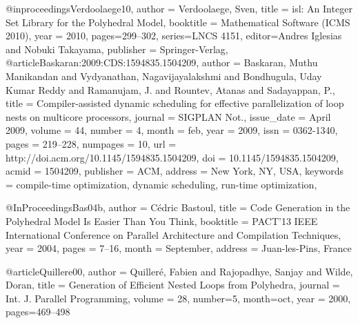 @inproceedings{Verdoolaege10,
   author = {Verdoolaege, Sven},
   title = {isl: {A}n Integer Set Library for the Polyhedral Model},
   booktitle = {Mathematical Software (ICMS 2010)},
   year = {2010},
   pages={299--302},
   series={LNCS 4151},
   editor={Andres Iglesias and Nobuki Takayama},
   publisher = {Springer-Verlag},
}
@article{Baskaran:2009:CDS:1594835.1504209,
 author = {Baskaran, Muthu Manikandan and Vydyanathan, Nagavijayalakshmi and Bondhugula, Uday Kumar Reddy and Ramanujam, J. and Rountev, Atanas and Sadayappan, P.},
 title = {Compiler-assisted dynamic scheduling for effective parallelization of loop nests on multicore processors},
 journal = {SIGPLAN Not.},
 issue_date = {April 2009},
 volume = {44},
 number = {4},
 month = feb,
 year = {2009},
 issn = {0362-1340},
 pages = {219--228},
 numpages = {10},
 url = {http://doi.acm.org/10.1145/1594835.1504209},
 doi = {10.1145/1594835.1504209},
 acmid = {1504209},
 publisher = {ACM},
 address = {New York, NY, USA},
 keywords = {compile-time optimization, dynamic scheduling, run-time optimization},
}

@InProceedings{Bas04b,
 author = {C\'{e}dric Bastoul},
 title = {Code Generation in the Polyhedral Model Is Easier Than You Think},
 booktitle = {PACT'13 IEEE International Conference on Parallel Architecture
              and Compilation Techniques},
 year =	2004,
 pages = {7--16},
 month = {September},
 address = {Juan-les-Pins, France}
}

@article{Quillere00,
 author = {Quiller\'{e}, Fabien and Rajopadhye, Sanjay and Wilde, Doran},
 title = {Generation of Efficient Nested Loops from Polyhedra},
 journal = {Int. J. Parallel Programming},
 volume = 28,
 number=5,
 month=oct,
 year = 2000,
pages={469--498}
}

